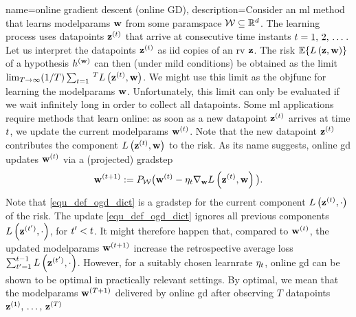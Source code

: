 {name={online gradient descent (online GD)}, 
	description={Consider  an \gls{ml} method that learns \gls{modelparams} 
		${\bf w}$ from some \gls{paramspace} $\mathcal{W} \subseteq \mathbb{R}^{d}$. 
		The learning process uses \gls{datapoint}s ${\bf z}^{(t)}$ that arrive at consecutive time instants $t=1, \,2, \,\dots$. 
		Let us interpret the \gls{datapoint}s ${\bf z}^{(t)}$ as \gls{iid} copies 
		of an \gls{rv} ${\bf z}$. The \gls{risk} $\mathbb{E}\{ L\left({\bf z},{\bf w} \right) \}$ of a 
		\gls{hypothesis} $h^{({\bf w})}$ can then (under mild conditions) be obtained as the limit 
		$\lim_{T\rightarrow \infty} (1/T)\sum_{t=1}\,^{T} L\left({\bf z}^{(t)},{\bf w} \right)$. 
		We might use this limit as the \gls{objfunc} for learning the \gls{modelparams} ${\bf w}$. 
		Unfortunately, this limit can only be evaluated if we wait infinitely long in order to collect all \gls{datapoint}s. 
		Some \gls{ml} applications require methods that learn online: as soon as a new \gls{datapoint} ${\bf z}^{(t)}$ 
		arrives at time $t$, we update the current \gls{modelparams} ${\bf w}^{(t)}$. Note that 
		the new \gls{datapoint} ${\bf z}^{(t)}$ contributes the component $L\left({\bf z}^{(t)},{\bf w} \right)$ 
		to the \gls{risk}. As its name suggests, online \gls{gd} updates ${\bf w}^{(t)}$ via a (projected) \gls{gradstep}
		\begin{equation} 
			\label{equ_def_ogd_dict}
 			{\bf w}^{(t+1)} := P_{\mathcal{W}}\big( {\bf w}^{(t)} - \eta_{t} \nabla_{{\bf w}} L\left({\bf z}^{(t)},{\bf w} \right)\big). 
		\end{equation} 
		Note that \eqref{equ_def_ogd_dict} is a \gls{gradstep} for the current component $L\left({\bf z}^{(t)},\cdot \right)$ 
		of the \gls{risk}. The update \eqref{equ_def_ogd_dict} ignores all previous components $L\left({\bf z}^{(t')},\cdot \right)$, 
		for $t' < t$. It might therefore happen that, compared to ${\bf w}^{(t)}$, the updated \gls{modelparams} 
		${\bf w}^{(t+1)}$ increase the retrospective average \gls{loss} $\sum_{t'=1}^{t-1} L\left({\bf z}^{(t')},\cdot \right)$. 
		However, for a suitably chosen \gls{learnrate} $\eta_{t}$, online \gls{gd} can be shown 
		to be optimal in practically relevant settings. By optimal, we mean that the \gls{modelparams} 
		${\bf w}^{(T+1)}$ delivered by online \gls{gd} after observing $T$ \gls{datapoint}s ${\bf z}^{(1)}, \,\ldots, \,{\bf z}^{(T)}$ 
}}
